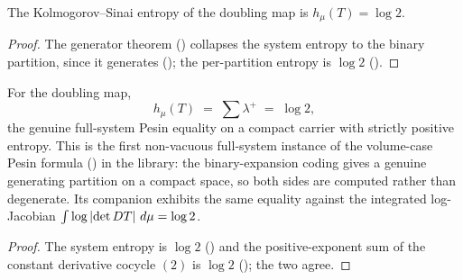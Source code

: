 \begin{theorem}\label{ksEntropy_doublingMap_eq_log_two}
  \leanok
  The Kolmogorov--Sinai entropy of the doubling map is \(h_\mu(T)=\log 2\).
\end{theorem}
\begin{proof}\leanok
  The generator theorem () collapses the
  system entropy to the binary partition, since it generates
  (); the per-partition entropy is \(\log 2\)
  ().
\end{proof}

\begin{theorem}\label{pesin_formula_doublingMap}
  \leanok
  For the doubling map,
  \[
    h_\mu(T) \;=\; \sum\lambda^{+} \;=\; \log 2 ,
  \]
  the genuine full-system Pesin equality on a compact carrier with strictly positive entropy. This
  is the first non-vacuous full-system instance of the volume-case Pesin formula
  () in the library: the binary-expansion coding gives a
  genuine generating partition on a compact space, so both sides are computed rather than
  degenerate. Its companion  exhibits the same equality against
  the integrated log-Jacobian \(\int\log\left\lvert \det DT \right\rvert\,d\mu=\log 2\).
\end{theorem}
\begin{proof}\leanok
  The system entropy is \(\log 2\) () and the
  positive-exponent sum of the constant derivative cocycle \((2)\) is \(\log 2\)
  (); the two agree.
\end{proof}
